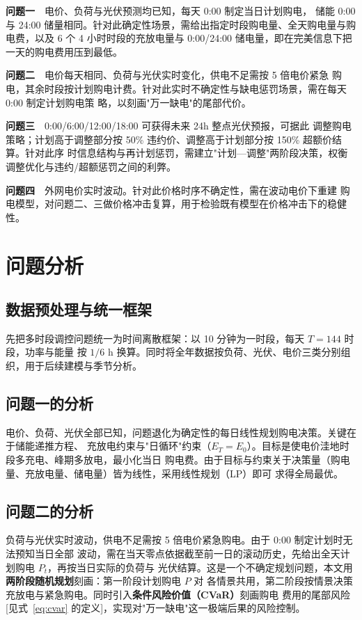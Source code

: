 \documentclass[withoutpreface]{cumcmthesis}
\begin{document}
\medskip\noindent\textbf{问题一}　电价、负荷与光伏预测均已知，每天 0:00 制定当日计划购电，
储能 0:00 与 24:00 储量相同。针对此确定性场景，需给出指定时段购电量、全天购电量与购电费，以及
6 个 4 小时时段的充放电量与 0:00/24:00 储电量，即在完美信息下把一天的购电费用压到最低。

\medskip\noindent\textbf{问题二}　电价每天相同、负荷与光伏实时变化，供电不足需按 5 倍电价紧急
购电，其余时段按计划购电计费。针对此实时不确定性与缺电惩罚场景，需在每天 0:00 制定计划购电策
略，以刻画"万一缺电"的尾部代价。

\medskip\noindent\textbf{问题三}　0:00/6:00/12:00/18:00 可获得未来 24h 整点光伏预报，可据此
调整购电策略；计划高于调整部分按 50\% 违约价、调整高于计划部分按 150\% 超额价结算。针对此序
时信息结构与再计划惩罚，需建立"计划—调整"两阶段决策，权衡调整优化与违约/超额惩罚之间的利弊。

\medskip\noindent\textbf{问题四}　外网电价实时波动。针对此价格时序不确定性，需在波动电价下重建
购电模型，对问题二、三做价格冲击复算，用于检验既有模型在价格冲击下的稳健性。

\section{问题分析}
\subsection{数据预处理与统一框架}
先把多时段调控问题统一为时间离散框架：以 10 分钟为一时段，每天 $T=144$ 时段，功率与能量
按 $1/6$ h 换算。同时将全年数据按负荷、光伏、电价三类分别组织，用于后续建模与季节分析。

\subsection{问题一的分析}
电价、负荷、光伏全部已知，问题退化为确定性的每日线性规划购电决策。关键在于储能递推方程、
充放电约束与"日循环"约束（$E_T=E_0$）。目标是使电价洼地时段多充电、峰期多放电，最小化当日
购电费。由于目标与约束关于决策量（购电量、充放电量、储电量）皆为线性，采用线性规划（LP）即可
求得全局最优。

\subsection{问题二的分析}
负荷与光伏实时波动，供电不足需按 5 倍电价紧急购电。由于 0:00 制定计划时无法预知当日全部
波动，需在当天零点依据截至前一日的滚动历史，先给出全天计划购电 $P_t$，再按当日实际的负荷与
光伏结算。这是一个不确定规划问题，本文用\textbf{两阶段随机规划}刻画：第一阶段计划购电 $P$ 对
各情景共用，第二阶段按情景决策充放电与紧急购电。同时引入\textbf{条件风险价值（CVaR）}刻画购电
费用的尾部风险[见式~\eqref{eq:cvar} 的定义]，实现对"万一缺电"这一极端后果的风险控制。
\end{document}
